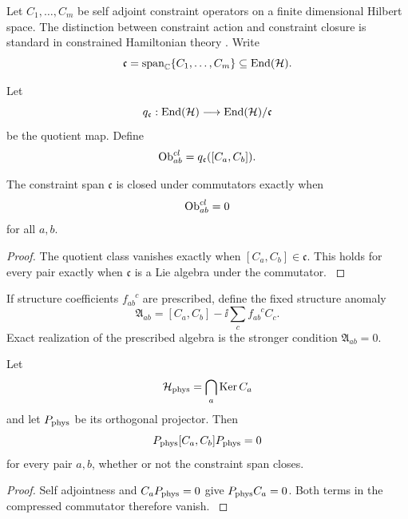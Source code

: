 Let \(C_1,\ldots,C_m\) be self adjoint constraint operators on a finite dimensional Hilbert space. The distinction between constraint action and constraint closure is standard in constrained Hamiltonian theory \cite{Dirac1964,HenneauxTeitelboim1992}. Write
\[
\mathfrak c=\operatorname{span}_{\CC}\{C_1,\ldots,C_m\}
\subseteq\End(\Hcal).
\]

\begin{definition}\label{strong:definition:009}\label{strong:def:closure_obstruction}
Let
\[
q_{\mathfrak c}:\End(\Hcal)\longrightarrow\End(\Hcal)/\mathfrak c
\]
be the quotient map. Define
\[
\Ob_{ab}^{\rm cl}
=
q_{\mathfrak c}([C_a,C_b]).
\]
\end{definition}

\begin{theorem}\label{strong:theorem:042}\label{strong:thm:constraint_closure}
The constraint span \(\mathfrak c\) is closed under commutators exactly when
\[
\Ob_{ab}^{\rm cl}=0
\]
for all \(a,b\).
\end{theorem}

\begin{proof}\label{strong:proof:068}
The quotient class vanishes exactly when \([C_a,C_b]\in\mathfrak c\). This holds for every pair exactly when \(\mathfrak c\) is a Lie algebra under the commutator.
\label{strong:proof:068:end}\end{proof}

If structure coefficients \(f_{ab}^{\phantom{ab}c}\) are prescribed, define the fixed structure anomaly
\[
\mathfrak A_{ab}
=
[C_a,C_b]
-\ii\sum_cf_{ab}^{\phantom{ab}c}C_c.
\]
Exact realization of the prescribed algebra is the stronger condition \(\mathfrak A_{ab}=0\).

\begin{proposition}\label{strong:proposition:011}\label{strong:prop:physical_compression_trivial}
Let
\[
\Hcal_{\phys}=\bigcap_a\Ker C_a
\]
and let \(P_{\phys}\) be its orthogonal projector. Then
\[
P_{\phys}[C_a,C_b]P_{\phys}=0
\]
for every pair \(a,b\), whether or not the constraint span closes.
\end{proposition}

\begin{proof}\label{strong:proof:069}
Self adjointness and \(C_aP_{\phys}=0\) give \(P_{\phys}C_a=0\). Both terms in the compressed commutator therefore vanish.
\label{strong:proof:069:end}\end{proof}

